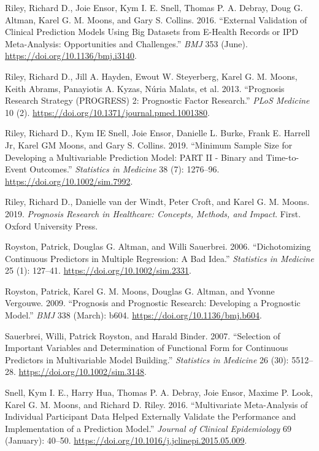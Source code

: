 \documentclass[
]{article}
\newlength{\cslhangindent}
\newenvironment{cslreferences}%
  {\setlength{\parindent}{0pt}%
  \everypar{\setlength{\hangindent}{\cslhangindent}}\ignorespaces}%
  {\par}
\begin{document}
\begin{cslreferences}
\leavevmode\hypertarget{ref-riley_external_2016}{}%
Riley, Richard D., Joie Ensor, Kym I. E. Snell, Thomas P. A. Debray, Doug G. Altman, Karel G. M. Moons, and Gary S. Collins. 2016. ``External Validation of Clinical Prediction Models Using Big Datasets from E-Health Records or IPD Meta-Analysis: Opportunities and Challenges.'' \emph{BMJ} 353 (June). \url{https://doi.org/10.1136/bmj.i3140}.

\leavevmode\hypertarget{ref-riley_prognosis_2013}{}%
Riley, Richard D., Jill A. Hayden, Ewout W. Steyerberg, Karel G. M. Moons, Keith Abrams, Panayiotis A. Kyzas, Núria Malats, et al. 2013. ``Prognosis Research Strategy (PROGRESS) 2: Prognostic Factor Research.'' \emph{PLoS Medicine} 10 (2). \url{https://doi.org/10.1371/journal.pmed.1001380}.

\leavevmode\hypertarget{ref-riley_minimum_2019}{}%
Riley, Richard D., Kym IE Snell, Joie Ensor, Danielle L. Burke, Frank E. Harrell Jr, Karel GM Moons, and Gary S. Collins. 2019. ``Minimum Sample Size for Developing a Multivariable Prediction Model: PART II - Binary and Time-to-Event Outcomes.'' \emph{Statistics in Medicine} 38 (7): 1276--96. \url{https://doi.org/10.1002/sim.7992}.

\leavevmode\hypertarget{ref-riley_prognosis_2019}{}%
Riley, Richard D., Danielle van der Windt, Peter Croft, and Karel G. M. Moons. 2019. \emph{Prognosis Research in Healthcare: Concepts, Methods, and Impact}. First. Oxford University Press.

\leavevmode\hypertarget{ref-royston_dichotomizing_2006}{}%
Royston, Patrick, Douglas G. Altman, and Willi Sauerbrei. 2006. ``Dichotomizing Continuous Predictors in Multiple Regression: A Bad Idea.'' \emph{Statistics in Medicine} 25 (1): 127--41. \url{https://doi.org/10.1002/sim.2331}.

\leavevmode\hypertarget{ref-royston_prognosis_2009}{}%
Royston, Patrick, Karel G. M. Moons, Douglas G. Altman, and Yvonne Vergouwe. 2009. ``Prognosis and Prognostic Research: Developing a Prognostic Model.'' \emph{BMJ} 338 (March): b604. \url{https://doi.org/10.1136/bmj.b604}.

\leavevmode\hypertarget{ref-sauerbrei_selection_2007}{}%
Sauerbrei, Willi, Patrick Royston, and Harald Binder. 2007. ``Selection of Important Variables and Determination of Functional Form for Continuous Predictors in Multivariable Model Building.'' \emph{Statistics in Medicine} 26 (30): 5512--28. \url{https://doi.org/10.1002/sim.3148}.

\leavevmode\hypertarget{ref-snell_multivariate_2016}{}%
Snell, Kym I. E., Harry Hua, Thomas P. A. Debray, Joie Ensor, Maxime P. Look, Karel G. M. Moons, and Richard D. Riley. 2016. ``Multivariate Meta-Analysis of Individual Participant Data Helped Externally Validate the Performance and Implementation of a Prediction Model.'' \emph{Journal of Clinical Epidemiology} 69 (January): 40--50. \url{https://doi.org/10.1016/j.jclinepi.2015.05.009}.


\end{cslreferences}
\end{document}

